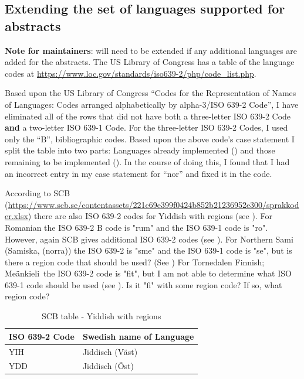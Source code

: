 \subsection{Extending the set of languages supported for abstracts}
\label{sec:newLanguagesFOrAbstracts}
\textbf{Note for maintainers}:  will need to be extended if any additional languages are added for the abstracts. The US Library of Congress has a table of the language codes at \url{https://www.loc.gov/standards/iso639-2/php/code_list.php}.

Based upon the US Library of Congress ``Codes for the Representation of Names of Languages: Codes arranged alphabetically by alpha-3/ISO 639-2 Code'', I have eliminated all of the rows that did not have both a three-letter ISO 639-2 Code \textbf{and} a two-letter ISO 639-1 Code. For the three-letter ISO 639-2 Codes, I used only the  ``B'', \ie bibliographic codes. Based upon the above code's case statement I split the table into two parts: Languages already implemented () and those remaining to be implemented (). In the course of doing this, I found that I had an incorrect entry in my case statement for ``nor'' and fixed it in the code.

According to SCB (\url{https://www.scb.se/contentassets/221c69e399f0424b852b21236952e300/sprakkoder.xlsx}) there are also ISO 639-2 codes for Yiddish with regions (see ). For Romanian the ISO 639-2 B code is "rum" and the ISO 639-1 code is  "ro". However, again SCB gives additional ISO 639-2 codes (see ). For Northern Sami (Samiska, (norra)) the ISO 639-2 is "sme" and the ISO 639-1 code is "se", but is there a region code that should be used? (See ) For Tornedalen Finnish; Meänkieli\ the ISO 639-2 code is "fit", but I am not able to determine what ISO 639-1 code should be used (see ). Is it "fi" with some region code? If so, what region code? 

\begin{table}[!htp]
    \caption{SCB table - Yiddish with regions}
    \label{tab:SCByiddish}
    \begin{tabular}{L{3cm}|L{6.5cm}}
      \textbf{ISO 639-2 Code} &\textbf{Swedish name of Language}\\
      \hline
YIH  &  Jiddisch (Väst)\\
YDD  &  Jiddisch (Öst)\\
\end{tabular}
\end{table}


